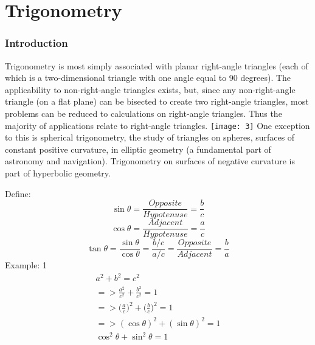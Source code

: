 \graphicspath{ {./Pictures/} }


\chapter{Trigonometry}




\subsection{Introduction}
	Trigonometry is most simply associated with planar right-angle triangles (each of which is a two-dimensional triangle with one angle equal to 90 degrees). The applicability to non-right-angle triangles exists, but, since any non-right-angle triangle (on a flat plane) can be bisected to create two right-angle triangles, most problems can be reduced to calculations on right-angle triangles. Thus the majority of applications relate to right-angle triangles.
	\texttt{[image: 3]}
	One exception to this is spherical trigonometry, the study of triangles on spheres, surfaces of constant positive curvature, in elliptic geometry (a fundamental part of astronomy and navigation). Trigonometry on surfaces of negative curvature is part of hyperbolic geometry.

Define:
\newline
\begin{equation}
	\sin\theta = \frac{Opposite}{Hypotenuse} = \frac{b}{c}
\end{equation}
\begin{equation}
	\cos\theta = \frac{Adjacent}{Hypotenuse} = \frac{a}{c}
\end{equation}
\begin{equation}
	\tan\theta = \frac{\sin\theta}{\cos\theta}= \frac{b/c}{a/c} = \frac{Opposite}{Adjacent} = \frac{b}{a}
\end{equation}
\newpage
Example: 1
\begin{align}
	a^2+b^2=c^2 \\
	=>\frac{a^2}{c^2}+\frac{b^2}{c^2} = 1 \\
	=> \bigg(\frac{a}{c}\bigg)^2 + \bigg(\frac{b}{c}\bigg)^2 = 1 \\
	=> (\cos\theta)^2+(\sin\theta)^2 = 1 \\
	\cos^2\theta+\sin^2\theta = 1 \\
\end{align}

